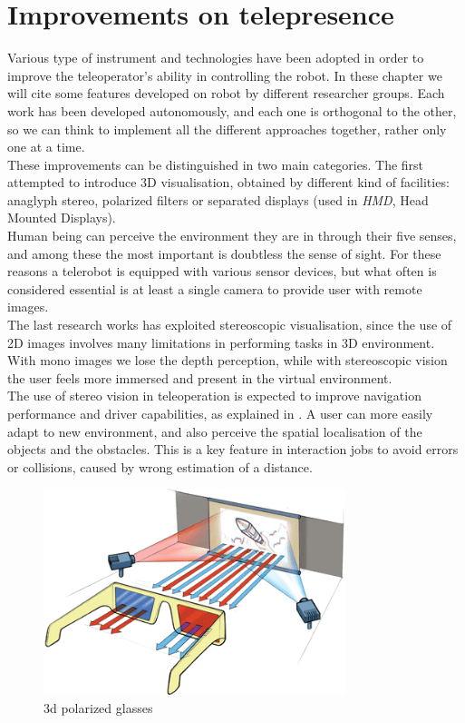 \section{Improvements on telepresence}
\label{intro:improvements_telepresence}

Various type of instrument and technologies have been adopted in order
to improve the teleoperator's ability in controlling the robot. In
these chapter we will cite some features developed on \morduc{}
robot by different researcher groups. Each work has been developed
autonomously, and each one is orthogonal to the other, so we can think
to implement all the different approaches together, rather only one
at a time.
\\
These improvements can be distinguished in two main categories. The
first attempted to introduce 3D visualisation, obtained by different
kind of facilities: anaglyph stereo, polarized filters or separated
displays (used in \textit{HMD}, Head Mounted Displays).
\\
Human being can perceive the environment they are in through their
five senses, and among these the most important is doubtless the sense
of sight.
For these reasons a telerobot is equipped with various sensor devices,
but what often is considered essential is at least a single camera to
provide user with remote images.
\\
The last research works has exploited stereoscopic visualisation, since
the use of 2D images involves many limitations in performing tasks
in 3D environment. With mono images we lose the depth perception,
while with stereoscopic vision the user feels more immersed and
present in the virtual environment.
\\
The use of stereo vision in teleoperation is expected
to improve navigation performance and driver capabilities, as explained in
\cite{morduc:neri}. A user can more easily adapt to new environment, and
also perceive the spatial localisation of the objects and the obstacles.
This is a key feature in interaction jobs to avoid errors or collisions,
caused by wrong estimation of a distance.
\begin{figure} [!h]
  \begin{center}
    \includegraphics[width=250pt]{img/3d-glasses.png}
    \caption{3d polarized glasses}
    \label{fig:3d-glasses}
  \end{center}
\end{figure}
